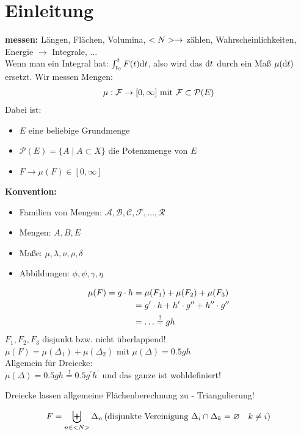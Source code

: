 \section{Einleitung}

\textbf{messen:} Längen, Flächen, Volumina, $<N> \to $ zählen, Wahrscheinlichkeiten, Energie $\to$ Integrale, ... \\
Wenn man ein Integral hat: $\int_{t_0}^{t}F(t)\mathrm{d} t$, also wird das $\mathrm{d} t$ durch ein Maß $\mu(\mathrm{d} t)$ ersetzt.
\newline Wir messen Mengen:
\begin{align}
	\mu: \mathcal{F} \to [0,\infty] \text{ mit }\mathcal{F} \subset \mathcal{P}(E) \notag
\end{align}
Dabei ist:
\begin{itemize}
	\item $E$ eine beliebige Grundmenge
	\item $\mathcal{P}(E)=\{A\mid A\subset X\}$ die Potenzmenge von $E$
	\item $F \to \mu(F) \in [0,\infty]$
\end{itemize}

\textbf{Konvention:}
\begin{itemize}
	\item Familien von Mengen: $\mathcal{A}, \mathcal{B}, \mathcal{C}, \mathcal{F}, \dots, \mathcal{R}$
	\item Mengen: $A, B, E$
	\item Maße: $\mu, \lambda, \nu, \rho, \delta$
	\item Abbildungen: $\phi, \psi, \gamma, \eta$
\end{itemize}

\begin{*example}[Flächenmessung]
	\begin{align}
		\mu(F) = g \cdot h &= \mu(F_1) + \mu(F_2) + \mu(F_3)\notag\\
		                   &= g^{\prime} \cdot h + h^{\prime}\cdot g^{\prime \prime} + h^{\prime \prime} \cdot g^{\prime \prime}\notag\\
		                   &= \dots \overset{!}{=} gh\notag
	\end{align}
	$F_1, F_2, F_3$ disjunkt bzw. nicht überlappend!\\
	$\mu(F) = \mu(\Delta_1)+\mu(\Delta_2)$ mit $\mu(\Delta) = 0.5 gh$\\ %
	Allgemein für Dreiecke: \\%
	$\mu(\Delta) = 0.5 gh \overset{!}{=} 0.5 g^{\prime}h^{\prime}$ und das ganze ist wohldefiniert!
\end{*example}
Dreiecke lassen allgemeine Flächenberechnung zu - Triangulierung!

\begin{align}
	F = \biguplus_{n\in <N>} \Delta_n\, (\text{disjunkte Vereinigung } \Delta_i \cap \Delta_k = \varnothing \quad k \neq i)\notag
\end{align} %



